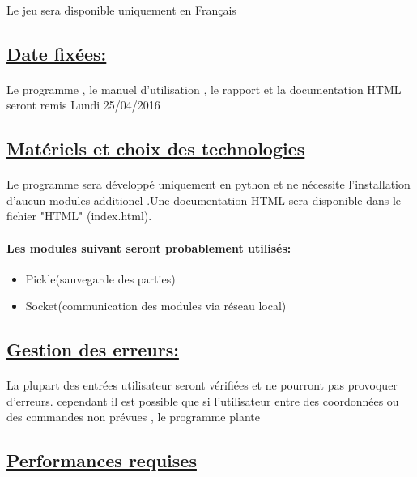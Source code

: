 \documentclass[a4paper,12pt]{article}
\begin{document}
\paragraph{}
Le jeu sera disponible uniquement en Français

\subsection{\underline{Date fixées:}}
\paragraph{}
Le programme , le manuel d'utilisation , le rapport et la documentation HTML seront remis Lundi 25/04/2016

\subsection{\underline{Matériels et choix des technologies}}
\paragraph{}
Le programme sera développé uniquement en python et ne nécessite l'installation d'aucun modules additionel .Une documentation HTML sera disponible dans le fichier "HTML" (index.html).
\newline
\paragraph{Les modules suivant seront probablement utilisés:}
\begin{itemize}
\item Pickle(sauvegarde des parties)
\item Socket(communication des modules via réseau local)
\end{itemize}


\subsection{\underline{Gestion des erreurs:}}
\paragraph{}
La plupart des entrées utilisateur seront vérifiées et ne pourront pas provoquer d'erreurs. cependant il est possible que si l'utilisateur entre des coordonnées ou des commandes non prévues , le programme plante

\subsection{\underline{Performances requises}}
\end{document}
